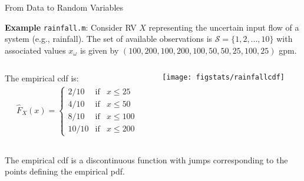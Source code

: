 \documentclass[9pt]{beamer}
\begin{document}
%
\begin{frame}{From Data to Random Variables}
\begin{block}{}
{\bf Example} {\tt rainfall.m}:  Consider RV $X$ representing the uncertain input flow of a system (e.g., rainfall). The set of available observations is $\mathcal{S}=\{1,2,...,10\}$ with associated values $x_\omega$ is given by $(100,200,100,200,100,50,50,25,100,25)$ gpm. 
\end{block}
\vspace{0.1in}
  \begin{columns}
    \begin{column}{0.5\textwidth}
 The empirical cdf is:   
\begin{align*}
\hat{F}_X(x)=\left\{\begin{array}{ccl}2/10&\textrm{if}&x\leq25\\ 
													 4/10&\textrm{if}&x\leq 50\\ 
													 8/10&\textrm{if}&x\leq 100\\
													10/10&\textrm{if}&x\leq 200 \end{array}\right.
\end{align*}
\end{column}
 \begin{column}{0.5\textwidth}
       \texttt{[image: figstats/rainfallcdf]}\\
 \end{column}
\end{columns}
The empirical cdf is a discontinuous function with jumps corresponding to the points defining the empirical pdf. 
\end{frame}
\end{document}
